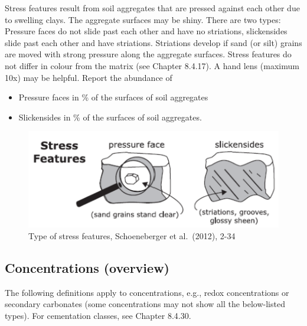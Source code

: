 \documentclass[
  letterpaper,
  DIV=11,
  numbers=noendperiod]{scrreprt}
\providecommand{\tightlist}{%
  \setlength{\itemsep}{0pt}\setlength{\parskip}{0pt}}\usepackage{longtable,booktabs,array}
\begin{document}
Stress features result from soil aggregates that are pressed against
each other due to swelling clays. The aggregate surfaces may be shiny.
There are two types: Pressure faces do not slide past each other and
have no striations, slickensides slide past each other and have
striations. Striations develop if sand (or silt) grains are moved with
strong pressure along the aggregate surfaces. Stress features do not
differ in colour from the matrix (see Chapter 8.4.17). A hand lens
(maximum 10x) may be helpful. Report the abundance of

\begin{itemize}
\tightlist
\item
  Pressure faces in \% of the surfaces of soil aggregates
\item
  Slickensides in \% of the surfaces of soil aggregates.
\end{itemize}

\begin{figure}

{\centering \includegraphics{./figure_8-17.png}

}

\caption{Type of stress features, Schoeneberger et al.~(2012), 2-34}

\end{figure}

\hypertarget{concentrations-overview}{%
\subsection{Concentrations (overview)}\label{concentrations-overview}}

The following definitions apply to concentrations, e.g., redox
concentrations or secondary carbonates (some concentrations may not show
all the below-listed types). For cementation classes, see Chapter
8.4.30.
\end{document}
